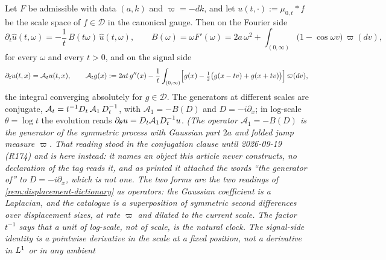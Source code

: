 \begin{proposition}\label{prop:scale-evolution}
\leanok
{}
Let $F$ be admissible with data $(a,k)$ and $\varpi = -dk$, and let $u(t,\cdot) :=
\mu_{0,t} * f$ be the scale space of $f \in \mathcal{D}$ in the canonical gauge. Then on the
Fourier side
\begin{equation}\label{eq:evolution-fourier}
  \partial_t\hat u(t,\omega) = -\frac1t\,B(t\omega)\,\hat u(t,\omega),
  \qquad
  B(\omega) = \omega F'(\omega)
   = 2a\,\omega^2 + \int_{(0,\infty)}\bigl(1 - \cos\omega v\bigr)\,\varpi(dv),
\end{equation}
for every $\omega$ and every $t > 0$, and on the signal side
\begin{equation}\label{eq:evolution-signal}
  \partial_t u(t,x) = \mathcal{A}_t u(t,x),
  \qquad
  \mathcal{A}_t g(x) := 2at\,g''(x)
   - \frac1t\int_{(0,\infty)}\Bigl[g(x) - \tfrac12\bigl(g(x-tv) + g(x+tv)\bigr)\Bigr]\,\varpi(dv),
\end{equation}
the integral converging absolutely for $g \in \mathcal{D}$. The generators at different scales
are conjugate, $\mathcal{A}_t = t^{-1}D_{t}\,\mathcal{A}_1\,D_{t}^{-1}$, with
$\mathcal{A}_1 = -B(D)$ and $D = -i\partial_x$; in log-scale $\theta = \log t$ the
evolution reads $\partial_\theta u = D_{t}\mathcal{A}_1D_{t}^{-1}u$.
\statusT\quad\emph{(The operator $\mathcal{A}_1 = -B(D)$ is the generator of the symmetric
\Levy{} process with Gaussian part $2a$ and folded jump measure $\varpi$. That reading stood in the
conjugation clause until 2026-09-19 (R174) and is here instead: it names an object this article
never constructs, no declaration of the tag reads it, and as printed it attached the words ``the
generator of'' to $D = -i\partial_x$, which is not one. The two forms are the two readings of
\ref{rem:displacement-dictionary} as operators: the Gaussian coefficient is a Laplacian, and
the catalogue is a superposition of symmetric second differences over displacement sizes, at
rate $\varpi$ and dilated to the current scale. The factor $t^{-1}$ says that a unit of
log-scale, not of scale, is the natural clock. The signal-side identity is a pointwise
derivative in the scale at a fixed position, not a derivative in $L^1$ or in any ambient
}
\end{proposition}
